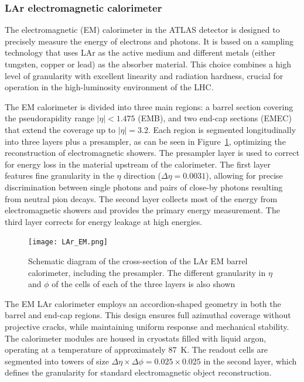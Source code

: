 \subsubsection{LAr electromagnetic calorimeter}
\label{sec:elelar}

The electromagnetic (EM) calorimeter in the ATLAS detector is designed to precisely measure the energy of electrons and photons. It is based on a sampling technology that uses LAr as the active medium and different metals (either tungsten, copper or lead) as the absorber material. This choice combines a high level of granularity with excellent linearity and radiation hardness, crucial for operation in the high-luminosity environment of the LHC.

The EM calorimeter is divided into three main regions: a barrel section covering the pseudorapidity range $|\eta| < 1.475$ (EMB), and two end-cap sections (EMEC) that extend the coverage up to $|\eta| = 3.2$. Each region is segmented longitudinally into three layers plus a presampler, as can be seen in Figure~\ref{fig:LAr_EM}, optimizing the reconstruction of electromagnetic showers. The presampler layer is used to correct for energy loss in the material upstream of the calorimeter. The first layer features fine granularity in the $\eta$ direction ($\Delta\eta = 0.0031$), allowing for precise discrimination between single photons and pairs of close-by photons resulting from neutral pion decays. The second layer collects most of the energy from electromagnetic showers and provides the primary energy measurement. The third layer corrects for energy leakage at high energies.

\begin{figure}[htbp]
    \centering
        \texttt{[image: LAr\_EM.png]}
    \caption{Schematic diagram of the cross-section of the LAr EM barrel calorimeter, including the presampler. The different granularity in $\eta$ and $\phi$ of the cells of each of the three layers is also shown~\cite{ATLAS:exp}}
    \label{fig:LAr_EM}
\end{figure}

The EM LAr calorimeter employs an accordion-shaped geometry in both the barrel and end-cap regions. This design ensures full azimuthal coverage without projective cracks, while maintaining uniform response and mechanical stability. The calorimeter modules are housed in cryostats filled with liquid argon, operating at a temperature of approximately 87~K. The readout cells are segmented into towers of size $\Delta\eta \times \Delta\phi = 0.025 \times 0.025$ in the second layer, which defines the granularity for standard electromagnetic object reconstruction.

